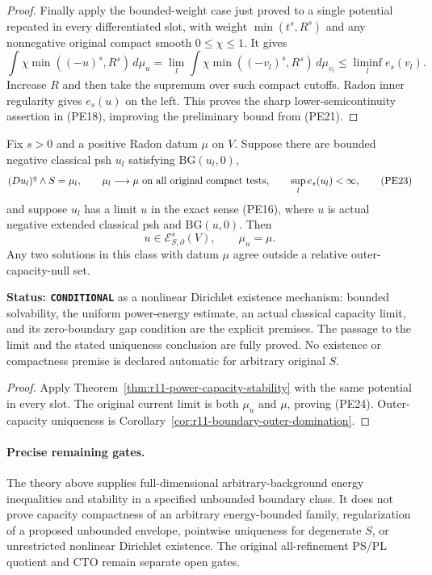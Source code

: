 \begin{proof}
Finally apply the bounded-weight case just proved to a single
potential repeated in every differentiated slot, with weight
$\min(t^s,R^s)$ and any nonnegative original compact smooth
$0\leq\chi\leq1$. It gives
\[
 \int\chi\min((-u)^s,R^s)\,d\mu_u
  =\lim_l\int\chi\min((-v_l)^s,R^s)\,d\mu_{v_l}
                         \leq\liminf_l e_s(v_l).
\]
Increase $R$ and then take the supremum over such compact
cutoffs. Radon inner regularity gives $e_s(u)$ on the left.
This proves the sharp lower-semicontinuity assertion in (PE18),
improving the preliminary bound from (PE21).
\end{proof}

\begin{corollary}
\label{cor:r11-power-Dirichlet-closure}
Fix $s>0$ and a positive Radon datum $\mu$ on $V$. Suppose there
are bounded negative classical psh $u_l$ satisfying
$\mathrm{BG}(u_l,0)$,
\[
 (Du_l)^q\wedge S=\mu_l,\qquad
 \mu_l\longrightarrow\mu\ \hbox{on all original compact tests},
 \qquad\sup_l e_s(u_l)<\infty,
 \tag{PE23}
\]
and suppose $u_l$ has a limit $u$ in the exact sense (PE16),
where $u$ is actual negative extended classical psh and
$\mathrm{BG}(u,0)$. Then
\[
                    u\in\mathcal E^s_{S,\partial}(V),
                    \qquad\mu_u=\mu.
 \tag{PE24}
\]
Any two solutions in this class with datum $\mu$ agree outside
a relative outer-capacity-null set.
\end{corollary}

\noindent\textbf{Status: \texttt{CONDITIONAL}} as a nonlinear
Dirichlet existence mechanism: bounded solvability, the uniform
power-energy estimate, an actual classical capacity limit, and
its zero-boundary gap condition are the explicit premises.
The passage to the limit and the stated uniqueness conclusion
are fully proved. No existence or compactness premise is declared
automatic for arbitrary original $S$.

\begin{proof}
Apply Theorem~\ref{thm:r11-power-capacity-stability} with the
same potential in every slot. The original current limit is
both $\mu_u$ and $\mu$, proving (PE24). Outer-capacity uniqueness
is Corollary~\ref{cor:r11-boundary-outer-domination}.
\end{proof}

\paragraph{Precise remaining gates.}
The theory above supplies full-dimensional arbitrary-background
energy inequalities and stability in a specified unbounded
boundary class. It does not prove capacity compactness of an
arbitrary energy-bounded family, regularization of a proposed
unbounded envelope, pointwise uniqueness for degenerate $S$,
or unrestricted nonlinear Dirichlet existence. The original
all-refinement PS/PL quotient and CTO remain separate open gates.
